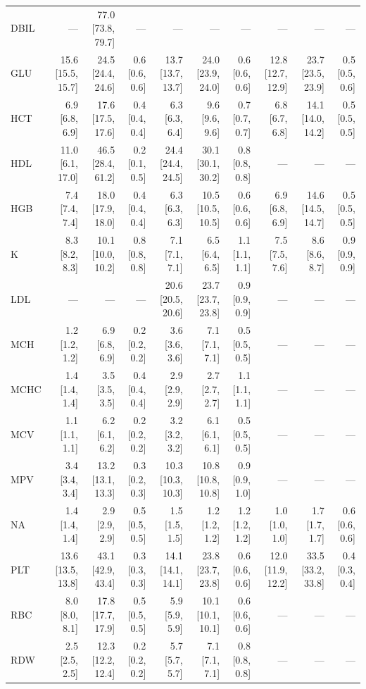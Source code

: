 \begin{table}[ht]
\begin{tabular}{lrrrrrrrrr}
DBIL & --- & 77.0 [73.8, 79.7] & --- & --- & --- & --- & --- & --- & --- \\
GLU & 15.6 [15.5, 15.7] & 24.5 [24.4, 24.6] & 0.6 [0.6, 0.6] & 13.7 [13.7, 13.7] & 24.0 [23.9, 24.0] & 0.6 [0.6, 0.6] & 12.8 [12.7, 12.9] & 23.7 [23.5, 23.9] & 0.5 [0.5, 0.6] \\
HCT & 6.9 [6.8, 6.9] & 17.6 [17.5, 17.6] & 0.4 [0.4, 0.4] & 6.3 [6.3, 6.4] & 9.6 [9.6, 9.6] & 0.7 [0.7, 0.7] & 6.8 [6.7, 6.8] & 14.1 [14.0, 14.2] & 0.5 [0.5, 0.5] \\
HDL & 11.0 [6.1, 17.0] & 46.5 [28.4, 61.2] & 0.2 [0.1, 0.5] & 24.4 [24.4, 24.5] & 30.1 [30.1, 30.2] & 0.8 [0.8, 0.8] & --- & --- & --- \\
HGB & 7.4 [7.4, 7.4] & 18.0 [17.9, 18.0] & 0.4 [0.4, 0.4] & 6.3 [6.3, 6.3] & 10.5 [10.5, 10.5] & 0.6 [0.6, 0.6] & 6.9 [6.8, 6.9] & 14.6 [14.5, 14.7] & 0.5 [0.5, 0.5] \\
K & 8.3 [8.2, 8.3] & 10.1 [10.0, 10.2] & 0.8 [0.8, 0.8] & 7.1 [7.1, 7.1] & 6.5 [6.4, 6.5] & 1.1 [1.1, 1.1] & 7.5 [7.5, 7.6] & 8.6 [8.6, 8.7] & 0.9 [0.9, 0.9] \\
LDL & --- & --- & --- & 20.6 [20.5, 20.6] & 23.7 [23.7, 23.8] & 0.9 [0.9, 0.9] & --- & --- & --- \\
MCH & 1.2 [1.2, 1.2] & 6.9 [6.8, 6.9] & 0.2 [0.2, 0.2] & 3.6 [3.6, 3.6] & 7.1 [7.1, 7.1] & 0.5 [0.5, 0.5] & --- & --- & --- \\
MCHC & 1.4 [1.4, 1.4] & 3.5 [3.5, 3.5] & 0.4 [0.4, 0.4] & 2.9 [2.9, 2.9] & 2.7 [2.7, 2.7] & 1.1 [1.1, 1.1] & --- & --- & --- \\
MCV & 1.1 [1.1, 1.1] & 6.2 [6.1, 6.2] & 0.2 [0.2, 0.2] & 3.2 [3.2, 3.2] & 6.1 [6.1, 6.1] & 0.5 [0.5, 0.5] & --- & --- & --- \\
MPV & 3.4 [3.4, 3.4] & 13.2 [13.1, 13.3] & 0.3 [0.2, 0.3] & 10.3 [10.3, 10.3] & 10.8 [10.8, 10.8] & 0.9 [0.9, 1.0] & --- & --- & --- \\
NA & 1.4 [1.4, 1.4] & 2.9 [2.9, 2.9] & 0.5 [0.5, 0.5] & 1.5 [1.5, 1.5] & 1.2 [1.2, 1.2] & 1.2 [1.2, 1.2] & 1.0 [1.0, 1.0] & 1.7 [1.7, 1.7] & 0.6 [0.6, 0.6] \\
PLT & 13.6 [13.5, 13.8] & 43.1 [42.9, 43.4] & 0.3 [0.3, 0.3] & 14.1 [14.1, 14.1] & 23.8 [23.7, 23.8] & 0.6 [0.6, 0.6] & 12.0 [11.9, 12.2] & 33.5 [33.2, 33.8] & 0.4 [0.3, 0.4] \\
RBC & 8.0 [8.0, 8.1] & 17.8 [17.7, 17.9] & 0.5 [0.5, 0.5] & 5.9 [5.9, 5.9] & 10.1 [10.1, 10.1] & 0.6 [0.6, 0.6] & --- & --- & --- \\
RDW & 2.5 [2.5, 2.5] & 12.3 [12.2, 12.4] & 0.2 [0.2, 0.2] & 5.7 [5.7, 5.7] & 7.1 [7.1, 7.1] & 0.8 [0.8, 0.8] & --- & --- & --- \\

\end{tabular}
\end{table}
